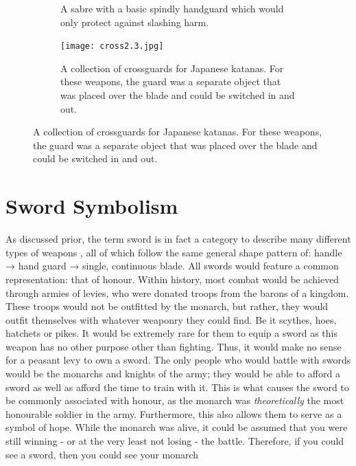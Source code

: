 \documentclass{article}
\begin{document}
\begin{figure}[H]
\begin{subfigure}{0.3\textwidth}
        \caption{A sabre with a basic spindly handguard which would only protect against slashing harm.}
        \label{fig:Cross2.4}
    \end{subfigure}
        \begin{subfigure}{0.75\textwidth}
        \centering
        \texttt{[image: cross2.3.jpg]}
        \caption{A collection of crossguards for Japanese katanas. For these weapons, the guard was a separate object that was placed over the blade and could be switched in and out.}
        \label{fig:Cross2.3}
    \end{subfigure}
\end{figure}

\pagebreak

\section{Sword Symbolism} \label{swordSymbol}
As discussed prior, the term sword is in fact a category to describe many different types of weapons \parencite{furat1998brief}, all of which follow the same general shape pattern of: handle → hand guard → single, continuous blade.
All swords would feature a common representation: that of honour. Within history, most combat would be achieved through armies of levies, who were donated troops from the barons of a kingdom. These troops would not be outfitted by the monarch, but rather, they would outfit themselves with whatever weaponry they could find. Be it scythes, hoes, hatchets or pikes. It would be extremely rare for them to equip a sword as this weapon has no other purpose other than fighting. Thus, it would make no sense for a peasant levy to own a sword. The only people who would battle with swords would be the monarchs and knights of the army; they would be able to afford a sword as well as afford the time to train with it. This is what causes the sword to be commonly associated with honour, as the monarch was \textit{theoretically} the most honourable soldier in the army. Furthermore, this also allows them to serve as a symbol of hope. While the monarch was alive, it could be assumed that you were still winning - or at the very least not losing - the battle. Therefore, if you could see a sword, then you could see your monarch
\end{document}

